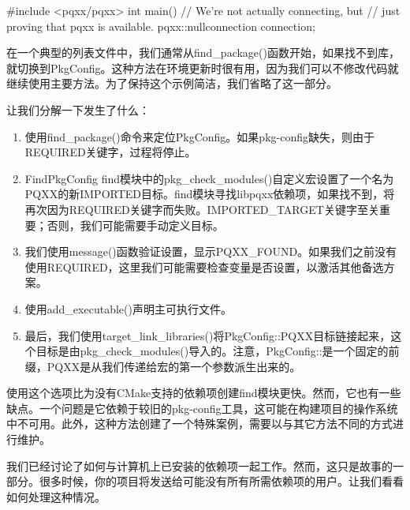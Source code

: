
\begin{cpp}
#include <pqxx/pqxx>
int main()
{
    // We're not actually connecting, but
    // just proving that pqxx is available.
    pqxx::nullconnection connection;
}
\end{cpp}

在一个典型的列表文件中，我们通常从find\_package()函数开始，如果找不到库，就切换到PkgConfig。这种方法在环境更新时很有用，因为我们可以不修改代码就继续使用主要方法。为了保持这个示例简洁，我们省略了这一部分。



让我们分解一下发生了什么：

\begin{enumerate}
\item
使用find\_package()命令来定位PkgConfig。如果pkg-config缺失，则由于REQUIRED关键字，过程将停止。

\item
FindPkgConfig find模块中的pkg\_check\_modules()自定义宏设置了一个名为PQXX的新IMPORTED目标。find模块寻找libpqxx依赖项，如果找不到，将再次因为REQUIRED关键字而失败。IMPORTED\_TARGET关键字至关重要；否则，我们可能需要手动定义目标。

\item
我们使用message()函数验证设置，显示PQXX\_FOUND。如果我们之前没有使用REQUIRED，这里我们可能需要检查变量是否设置，以激活其他备选方案。

\item
使用add\_executable()声明主可执行文件。

\item
最后，我们使用target\_link\_libraries()将PkgConfig::PQXX目标链接起来，这个目标是由pkg\_check\_modules()导入的。注意，PkgConfig::是一个固定的前缀，PQXX是从我们传递给宏的第一个参数派生出来的。
\end{enumerate}

使用这个选项比为没有CMake支持的依赖项创建find模块更快。然而，它也有一些缺点。一个问题是它依赖于较旧的pkg-config工具，这可能在构建项目的操作系统中不可用。此外，这种方法创建了一个特殊案例，需要以与其它方法不同的方式进行维护。

我们已经讨论了如何与计算机上已安装的依赖项一起工作。然而，这只是故事的一部分。很多时候，你的项目将发送给可能没有所有所需依赖项的用户。让我们看看如何处理这种情况。























